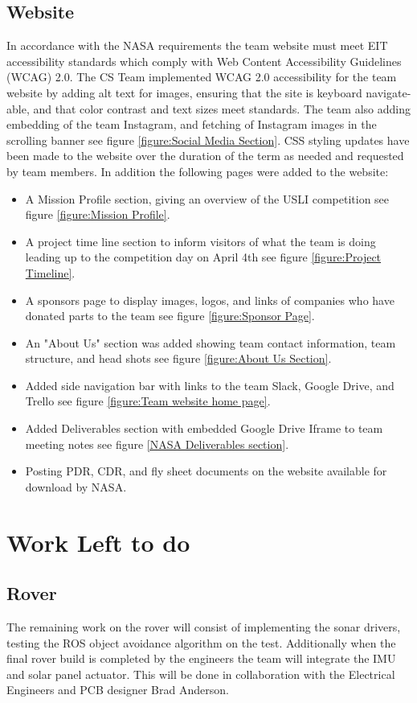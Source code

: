 \documentclass[onecolumn, draftclsnofoot,10pt, compsoc]{IEEEtran}
\begin{document}
\subsection{Website}
In accordance with the NASA requirements the team website must meet EIT accessibility standards which comply with Web Content Accessibility Guidelines (WCAG) 2.0. The CS Team implemented WCAG 2.0 accessibility for the team website by adding alt text for images, ensuring that the site is keyboard navigate-able, and that color contrast and text sizes meet standards. The team also adding embedding of the team Instagram, and fetching of Instagram images in the scrolling banner see figure \ref{figure:Social Media Section}. CSS styling updates have been made to the website over the duration of the term as needed and requested by team members. In addition the following pages were added to the website:
\begin{itemize}
\item A Mission Profile section, giving an overview of the USLI competition see figure \ref{figure:Mission Profile}.
\item A project time line section to inform visitors of what the team is doing leading up to the competition day on April 4th see figure \ref{figure:Project Timeline}.
\item A sponsors page to display images, logos, and links of companies who have donated parts to the team see figure \ref{figure:Sponsor Page}.
\item An "About Us" section was added showing team contact information, team structure, and head shots see figure \ref{figure:About Us Section}.
\item Added side navigation bar with links to the team Slack, Google Drive, and Trello see figure \ref{figure:Team website home page}.
\item Added Deliverables section with embedded Google Drive Iframe to team meeting notes see figure \ref{NASA Deliverables section}.
\item Posting PDR, CDR, and fly sheet documents on the website available for download by NASA.
\end{itemize}

\section{Work Left to do}
\subsection{Rover}
The remaining work on the rover will consist of implementing the sonar drivers, testing the ROS object avoidance algorithm on the test. Additionally when the final rover build is completed by the engineers the team will integrate the IMU and solar panel actuator. This will be done in collaboration with the Electrical Engineers and PCB designer Brad Anderson.
\end{document}
